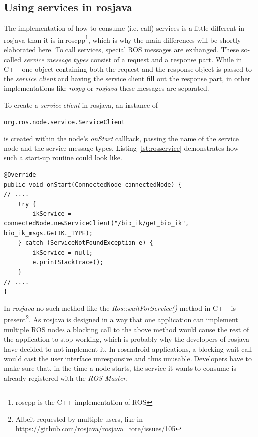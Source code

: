 \subsection{Using services in rosjava}

The implementation of how to consume (i.e. call) services is a little different in rosjava than it is in roscpp\footnote{roscpp is the C++ implementation of ROS}, which is why the main differences will be shortly elaborated here. To call services, special ROS messages are exchanged. These so-called \textit{service message types} consist of a request and a response part. While in C++ one object containing both the request and the response object is passed to the \textit{service client} and having the service client fill out the response part\cite{ros:serviceclient}, in other implementations like \textit{rospy} or \textit{rosjava} these messages are separated.

To create a \textit{service client} in rosjava, an instance of 

\begin{lstlisting}[numbers=none]
org.ros.node.service.ServiceClient
\end{lstlisting}

is created within the node's \textit{onStart} callback, passing the name of the service node and the service message types. Listing \ref{lst:rosservice} demonstrates how such a start-up routine could look like.

\begin{lstlisting}[caption={Example on how to connect to a ROS service in rosjava},label=lst:rosservice]
@Override
public void onStart(ConnectedNode connectedNode) {
// ....
	try {
		ikService = connectedNode.newServiceClient("/bio_ik/get_bio_ik", bio_ik_msgs.GetIK._TYPE);
	} catch (ServiceNotFoundException e) {
		ikService = null;
		e.printStackTrace();
	}	
// ....
}
\end{lstlisting}

In \textit{rosjava} no such method like the \textit{Ros::waitForService()} method in C++ is present\footnote{Albeit requested by multiple users, like in \url{https://github.com/rosjava/rosjava_core/issues/105}}. As rosjava is designed in a way that one application can implement multiple ROS nodes a blocking call to the above method would cause the rest of the application to stop working, which is probably why the developers of rosjava have decided to not implement it. In rosandroid applications, a blocking wait-call would cast the user interface unresponsive and thus unusable. Developers have to make sure that, in the time a node starts, the service it wants to consume is already registered with the \textit{ROS Master}.


